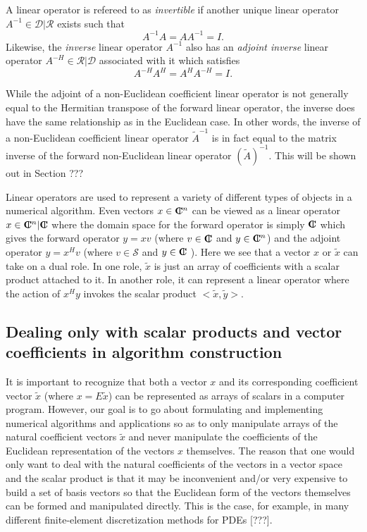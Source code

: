 \documentclass[pdf,ps2pdf,11pt]{SANDreport}
\begin{document}
A linear operator is refereed to as {}\textit{invertible} if another unique
linear operator $A^{-1}\in\mathcal{D}|\mathcal{R}$ exists such that
%
\[
A^{-1} A = A A^{-1} = I.
\]
%
Likewise, the {}\textit{inverse} linear operator $A^{-1}$ also has an
{}\textit{adjoint inverse} linear operator $A^{-H}\in\mathcal{R}|\mathcal{D}$
associated with it which satisfies
%
\[
A^{-H} A^H = A^H A^{-H} = I.
\]
%

While the adjoint of a non-Euclidean coefficient linear operator is not
generally equal to the Hermitian transpose of the forward linear operator, the
inverse does have the same relationship as in the Euclidean case.  In other
words, the inverse of a non-Euclidean coefficient linear operator
$\tilde{A}^{-1}$ is in fact equal to the matrix inverse of the forward
non-Euclidean linear operator $(\tilde{A})^{-1}$.  This will be shown out in
Section ???

Linear operators are used to represent a variety of different types of objects
in a numerical algorithm.  Even vectors $x\in\mbox{\textbf{C}}\hspace{-1.1ex}\mbox{l}\hspace{0.4ex}^n$ can be viewed as a
linear operator $x\in\mbox{\textbf{C}}\hspace{-1.1ex}\mbox{l}\hspace{0.4ex}^n|\mbox{\textbf{C}}\hspace{-1.1ex}\mbox{l}\hspace{0.4ex}$ where the domain space for the forward
operator is simply $\mbox{\textbf{C}}\hspace{-1.1ex}\mbox{l}\hspace{0.4ex}$ which gives the forward operator $y = x v$ (where
$v\in\mbox{\textbf{C}}\hspace{-1.1ex}\mbox{l}\hspace{0.4ex}$ and $y\in\mbox{\textbf{C}}\hspace{-1.1ex}\mbox{l}\hspace{0.4ex}^n$) and the adjoint operator $y = x^H v$ (where
$v\in\mathcal{S}$ and $y\in\mbox{\textbf{C}}\hspace{-1.1ex}\mbox{l}\hspace{0.4ex}$ ).  Here we see that a vector $x$ or
$\tilde{x}$ can take on a dual role.  In one role, $\tilde{x}$ is just an
array of coefficients with a scalar product attached to it.  In another role,
it can represent a linear operator where the action of $x^H y$ invokes the
scalar product $<\tilde{x},\tilde{y}>$.

\subsection{Dealing only with scalar products and vector coefficients in algorithm construction}

It is important to recognize that both a vector $x$ and its corresponding
coefficient vector $\tilde{x}$ (where $x = E\tilde{x}$) can be represented as
arrays of scalars in a computer program.  However, our goal is to go about
formulating and implementing numerical algorithms and applications so as to
only manipulate arrays of the natural coefficient vectors $\tilde{x}$ and
never manipulate the coefficients of the Euclidean representation of the
vectors $x$ themselves.  The reason that one would only want to deal with the
natural coefficients of the vectors in a vector space and the scalar product
is that it may be inconvenient and/or very expensive to build a set of basis
vectors so that the Euclidean form of the vectors themselves can be formed and
manipulated directly.  This is the case, for example, in many different
finite-element discretization methods for PDEs [???].
\end{document}
